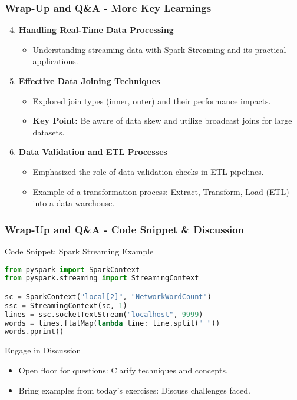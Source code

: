 \documentclass[aspectratio=169]{beamer}
\begin{document}
\begin{frame}[fragile]
    \frametitle{Wrap-Up and Q\&A - More Key Learnings}
    \begin{enumerate}
        \setcounter{enumi}{3}
        \item \textbf{Handling Real-Time Data Processing}
        \begin{itemize}
            \item Understanding streaming data with Spark Streaming and its practical applications.
        \end{itemize}

        \item \textbf{Effective Data Joining Techniques}
        \begin{itemize}
            \item Explored join types (inner, outer) and their performance impacts.
            \item \textbf{Key Point:} Be aware of data skew and utilize broadcast joins for large datasets.
        \end{itemize}

        \item \textbf{Data Validation and ETL Processes}
        \begin{itemize}
            \item Emphasized the role of data validation checks in ETL pipelines.
            \item Example of a transformation process: Extract, Transform, Load (ETL) into a data warehouse.
        \end{itemize}
    \end{enumerate}
\end{frame}

\begin{frame}[fragile]
    \frametitle{Wrap-Up and Q\&A - Code Snippet & Discussion}
    \begin{block}{Code Snippet: Spark Streaming Example}
    \begin{lstlisting}[language=Python]
from pyspark import SparkContext
from pyspark.streaming import StreamingContext

sc = SparkContext("local[2]", "NetworkWordCount")
ssc = StreamingContext(sc, 1)
lines = ssc.socketTextStream("localhost", 9999)
words = lines.flatMap(lambda line: line.split(" "))
words.pprint()
    \end{lstlisting}
    \end{block}

    \begin{block}{Engage in Discussion}
        \begin{itemize}
            \item Open floor for questions: Clarify techniques and concepts.
            \item Bring examples from today’s exercises: Discuss challenges faced.
        \end{itemize}
    \end{block}
\end{frame}
\end{document}
